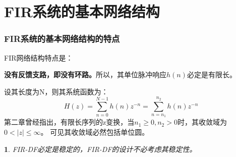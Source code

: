 \documentclass[notheorems,compress,mathserif,table]{beamer}
\newtheorem{dablock}{}
\begin{document}
\section{FIR系统的基本网络结构}
\begin{frame}\frametitle{FIR系统的基本网络结构的特点}%

FIR网络结构特点是：\par

\textbf{没有反馈支路，即没有环路。}所以，其单位脉冲响应$h(n)$必定是有限长。
\newline

设其长度为N，则其系统函数为：
$$H(z) = \sum_{n=0}^{N-1}h(n)z^{-n}=\sum_{n=n_1}^{n_2}h(n)z^{-n}$$
第二章曾经指出，有限长序列的z变换，当$n_1\geq0,n_2>0$时，其收敛域为$0<|z|\leq\infty$。
可见其收敛域必然包括单位圆。
\newline
\pause
\begin{dablock}
 FIR-DF必定是稳定的，FIR-DF的设计不必考虑其稳定性。
\end{dablock}
\end{frame}
\end{document}
